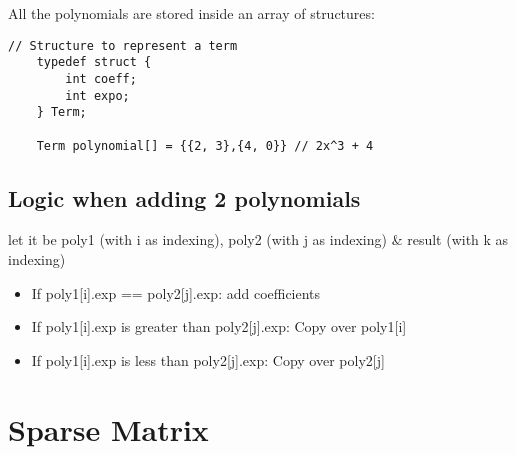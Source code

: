 \documentclass{article}
\begin{document}
All the polynomials are stored inside an array of structures:
\begin{lstlisting}[caption={Sparse Polynomial Addition Outline}]
    // Structure to represent a term
    typedef struct {
        int coeff;
        int expo;
    } Term;

    Term polynomial[] = {{2, 3},{4, 0}} // 2x^3 + 4
\end{lstlisting}

\subsection{Logic when adding 2 polynomials}
let it be poly1 (with i as indexing),  poly2 (with j as indexing) \&  result (with k as indexing)

\begin{itemize}
    \item If poly1[i].exp ==  poly2[j].exp: add coefficients
    \item If poly1[i].exp is greater than poly2[j].exp: Copy over poly1[i]
    \item If poly1[i].exp is less than poly2[j].exp: Copy over poly2[j]
\end{itemize}

\section{Sparse Matrix}
\end{document}
